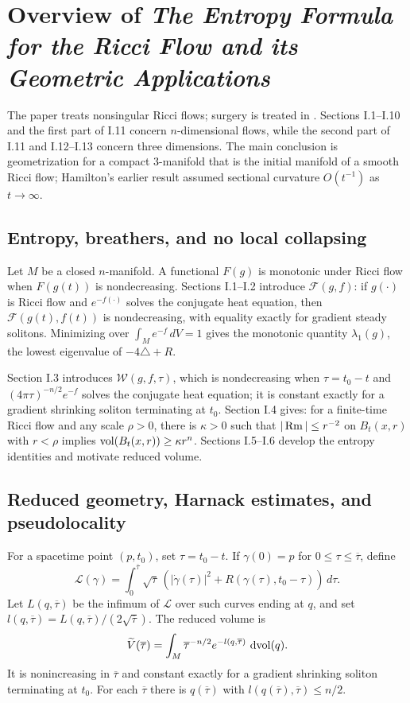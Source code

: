 \section{Overview of
 \emph{The Entropy Formula for the Ricci
Flow and its Geometric
Applications}
\cite{Perelman}}
\label{overview1}

The paper \cite{Perelman} treats nonsingular Ricci flows; surgery is treated
in \cite{Perelman2}.  Sections I.1--I.10 and the first part of I.11 concern
$n$-dimensional flows, while the second part of I.11 and I.12--I.13 concern
three dimensions.  The main conclusion is geometrization for a compact
$3$-manifold that is the initial manifold of a smooth Ricci flow; Hamilton's
earlier result \cite{Hamiltonn} assumed sectional curvature $O(t^{-1})$ as
$t\rightarrow\infty$.

\subsection{Entropy, breathers, and no local collapsing}

Let $M$ be a closed $n$-manifold.  A functional $F(g)$ is monotonic under
Ricci flow when $F(g(t))$ is nondecreasing.  Sections I.1--I.2 introduce
${\mathcal F}(g,f)$: if $g(\cdot)$ is Ricci flow and $e^{-f(\cdot)}$ solves
the conjugate heat equation, then ${\mathcal F}(g(t),f(t))$ is nondecreasing,
with equality exactly for gradient steady solitons.  Minimizing over
$\int_Me^{-f}\,dV=1$ gives the monotonic quantity $\lambda_1(g)$, the lowest
eigenvalue of $-4\triangle+R$.

Section I.3 introduces ${\mathcal W}(g,f,\tau)$, which is nondecreasing when
$\tau=t_0-t$ and $(4\pi\tau)^{-n/2}e^{-f}$ solves the conjugate heat equation;
it is constant exactly for a gradient shrinking soliton terminating at $t_0$.
Section I.4 gives: for a finite-time Ricci flow and any scale $\rho>0$,
there is $\kappa>0$ such that
$|\operatorname{Rm}|\leq r^{-2}$ on $B_t(x,r)$ with $r<\rho$ implies
$\operatorname{vol}(B_t(x,r))\geq\kappa r^n$.  Sections I.5--I.6 develop the entropy
identities and motivate reduced volume.

\subsection{Reduced geometry, Harnack estimates, and pseudolocality}

For a spacetime point $(p,t_0)$, set $\tau=t_0-t$.  If
$\gamma(0)=p$ for $0\leq\tau\leq\overline\tau$, define
\begin{equation}
{\mathcal L}(\gamma)=\int_0^{\overline\tau}\sqrt{\tau}\,
\left(|\dot\gamma(\tau)|^2+R(\gamma(\tau),t_0-\tau)\right)\,d\tau.
\end{equation}
Let $L(q,\overline\tau)$ be the infimum of ${\mathcal L}$ over such curves
ending at $q$, and set
$l(q,\overline\tau)=L(q,\overline\tau)/(2\sqrt{\overline\tau})$.  The
reduced volume is
\[
\widetilde V(\overline\tau)=\int_M\overline\tau^{-n/2}
e^{-l(q,\overline\tau)}\,\operatorname{dvol}(q).
\]
It is nonincreasing in $\overline\tau$ and constant exactly for a gradient
shrinking soliton terminating at $t_0$.  For each $\overline\tau$ there is
$q(\overline\tau)$ with $l(q(\overline\tau),\overline\tau)\leq n/2$.

